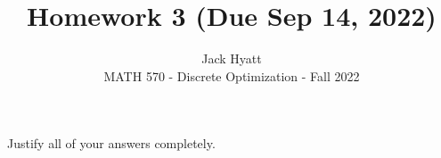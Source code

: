 \documentclass[12pt]{article}
\begin{document}
	
	
	
	\title{Homework 3 (Due Sep 14, 2022)}%
	\author{Jack Hyatt\\ %
		MATH 570 - Discrete Optimization - Fall 2022} %
	
	\maketitle
	
	Justify all of your answers completely.
	
\end{document}

